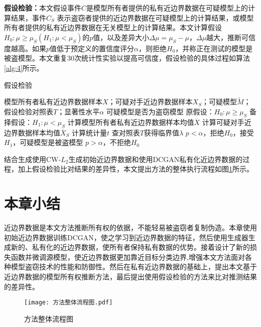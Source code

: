 \noindent\textbf{假设检验：}本文假设事件$C$是模型所有者提供的私有近边界数据在可疑模型上的计算结果，事件$C_S$ 表示盗窃者提供的近边界数据在可疑模型上的计算结果，或模型所有者提供的私有近边界数据在无关模型上的计算结果。本文计算假设$H_0:\mu \geq \mu_S(H_1:\mu < \mu_S)$的$p$值，以及差异大小$\Delta \mu = \mu_S - \mu$，$\Delta\mu$越大，推断可信度越高。如果$p$值低于预定义的置信度评分$\alpha$，则拒绝$H_0$，并称正在测试的模型是被盗模型。本文重复30次统计性实验以提高可信度，假设检验的具体过程如算法\ref{alg:4}所示。

\begin{algorithm}[H] 
	\caption{\small 假设检验}
	\label{alg:4}
	\small
	\begin{algorithmic}[1]
		\Require 模型所有者私有近边界数据样本$X$；可疑对手近边界数据样本$X_S$；可疑模型$\tilde{M}$；假设检验对照表$T$；显著性水平$\alpha$
		\Ensure 可疑模型是否为盗窃模型
		\State 原假设：$H_0:\mu \geq \mu_S$
		\State 备择假设：$H_1:\mu < \mu_S$
		\State 计算模型所有者私有近边界数据样本均值$\overline{X}$                     
		\State 计算可疑对手近边界数据样本均值$\overline{X}_S$ 
		\State 计算统计量$t$
		\State 查对照表$T$获得临界值$\lambda$
		\State $p < \alpha$，拒绝$H_0$，接受$H_1$，可疑模型是被盗模型
		\Else \State $p > \alpha$，不拒绝$H_0$
		\EndIf
	\end{algorithmic}
\end{algorithm}

结合生成使用CW-$L_2$生成初始近边界数据和使用DCGAN私有化近边界数据的过程，加上假设检验比对结果的差异性，本文提出方法的整体执行流程如图\ref{方法整体流程图}所示。



\section{本章小结}

近边界数据是本文方法推断所有权的依据，不能轻易被盗窃者复制伪造。本章使用初始近边界数据训练DCGAN，使之学习到近边界数据的特征，然后使用生成器生成新的、私有化的近边界数据，使所有者保持私有数据的优势。接着设计了新的损失函数并微调源模型，使近边界数据更加靠近目标分类边界,增强本文方法面对各种模型盗窃技术的性能和防御性。然后在私有近边界数据的基础上，提出本文基于近边界数据的模型所有权推断方法，最后提出使用假设检验的方法来比对推测结果的差异性。

\begin{figure}[htb]%
	\centering
	\setlength{\abovecaptionskip}{5mm} %
	\texttt{[image: 方法整体流程图.pdf]}
	\caption{方法整体流程图}
	\label{方法整体流程图}
	\end {figure}